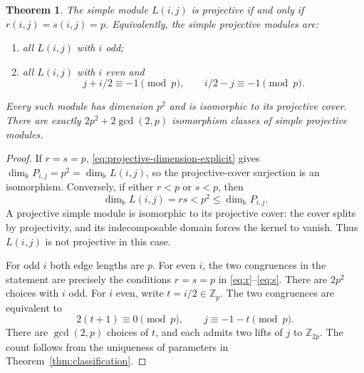 \documentclass[10pt,oneside]{amsart}
\newcommand{\kk}{\Bbbk}
\newcommand{\Z}{\mathbb Z}
\newtheorem{theorem}[proposition]{Theorem}
\theoremstyle{definition}
\begin{document}
\begin{theorem}\label{thm:simple-projective-classification}
The simple module $L(i,j)$ is projective if and only if
$r(i,j)=s(i,j)=p$. Equivalently, the simple projective modules are:
\begin{enumerate}[label=\textup{(\alph*)}]
 \item all $L(i,j)$ with $i$ odd;
 \item all $L(i,j)$ with $i$ even and
 \[
 j+i/2\equiv-1\pmod p,\qquad i/2-j\equiv-1\pmod p.
 \]
\end{enumerate}
Every such module has dimension $p^2$ and is isomorphic to its
projective cover. There are exactly $2p^2+2\gcd(2,p)$
isomorphism classes of simple projective modules.
\end{theorem}
\begin{proof}
If $r=s=p$, \eqref{eq:projective-dimension-explicit} gives
$\dim_{\kk}P_{i,j}=p^2=\dim_{\kk}L(i,j)$, so the projective-cover
surjection is an isomorphism. Conversely, if either $r<p$ or
$s<p$, then
\[
 \dim_{\kk}L(i,j)=rs<p^2\le\dim_{\kk}P_{i,j}.
\]
A projective simple module is isomorphic to its projective cover:
the cover splits by projectivity, and its indecomposable domain
forces the kernel to vanish. Thus $L(i,j)$ is not projective
in this case.

For odd $i$ both edge lengths are $p$. For even $i$, the two
congruences in the statement are precisely the conditions
$r=s=p$ in \eqref{eq:r}--\eqref{eq:s}. There are $2p^2$ choices
with $i$ odd. For $i$ even, write $t=i/2\in\Z_p$. The two
congruences are equivalent to
\[
 2(t+1)\equiv0\pmod p,\qquad j\equiv-1-t\pmod p.
\]
There are $\gcd(2,p)$ choices of $t$, and each admits two lifts
of $j$ to $\Z_{2p}$. The count follows from the uniqueness of
parameters in Theorem~\ref{thm:classification}.
\end{proof}
\end{document}
